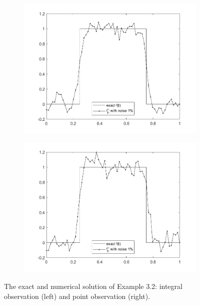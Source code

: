 \documentclass[]{article}
\begin{document}
\begin{figure}[h!]
	\begin{subfigure}{.5\linewidth}
		\centering
		\includegraphics[width=\linewidth]{../Csharp/Results/HS_Integration_ft2}
	\end{subfigure}%
	\begin{subfigure}{.5\linewidth}
		\centering
		\includegraphics[width=\linewidth]{../Csharp/Results/HS_1Point_ft2}
	\end{subfigure}
	\caption{The exact and numerical solution of Example 3.2: integral observation (left) and point observation (right).}
\end{figure}
\end{document}
